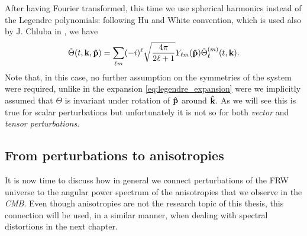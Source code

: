 After having Fourier transformed, this time we use spherical harmonics instead of the Legendre polynomials: following Hu and White \cite{HuWhite} convention, which is used also by J. Chluba in \cite{Chluba_tens_diss}, we have
\begin{equation}
    \label{eq:TensorMultipoleExpansion}
    \tilde\Theta(t,\mathbf k,\mathbf{\hat{p}})=\sum_{\ell m} (-i)^{\ell}\sqrt{\frac{4\pi}{2\ell+1}}Y_{\ell m}(\mathbf{\hat{p}})\tilde\Theta_{\ell}^{(m)}(t,\mathbf k).
\end{equation}
Note that, in this case, no further assumption on the symmetries of the system were required, unlike in the expansion \ref{eq:legendre_expansion} were we implicitly assumed that $\Theta$ is invariant under rotation of $\mathbf{\hat{p}}$ around $\mathbf{\hat{k}}$. As we will see this is true for scalar perturbations but unfortunately it is not so for both \emph{vector} and \emph{tensor perturbations}. 
\subsection{From perturbations to anisotropies}\label{sec:PertToAnis}
It is now time to discuss how in general we connect perturbations of the FRW universe to the angular power spectrum of the anisotropies that we observe in the \emph{CMB}. Even though anisotropies are not the research topic of this thesis, this connection will be used, in a similar manner, when dealing with spectral distortions in the next chapter. 

